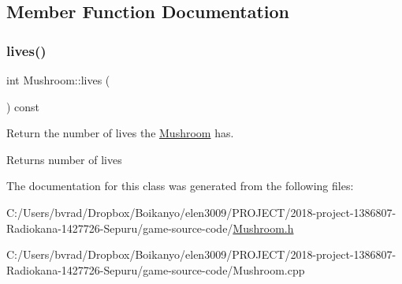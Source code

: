 \subsection{Member Function Documentation}
\mbox{\label{class_mushroom_afe84a485e2eb67e1efadd49ef77cb79e}} 
\subsubsection{\texorpdfstring{lives()}{lives()}}
{\footnotesize\ttfamily int Mushroom\+::lives (\begin{DoxyParamCaption}{ }\end{DoxyParamCaption}) const\hspace{0.3cm}{\ttfamily [inline]}}



Return the number of lives the \mbox{\hyperlink{class_mushroom}{Mushroom}} has. 

\begin{DoxyReturn}{Returns}
number of lives 
\end{DoxyReturn}


The documentation for this class was generated from the following files\+:\begin{DoxyCompactItemize}
\item 
C\+:/\+Users/bvrad/\+Dropbox/\+Boikanyo/elen3009/\+P\+R\+O\+J\+E\+C\+T/2018-\/project-\/1386807-\/\+Radiokana-\/1427726-\/\+Sepuru/game-\/source-\/code/\mbox{\hyperlink{_mushroom_8h}{Mushroom.\+h}}\item 
C\+:/\+Users/bvrad/\+Dropbox/\+Boikanyo/elen3009/\+P\+R\+O\+J\+E\+C\+T/2018-\/project-\/1386807-\/\+Radiokana-\/1427726-\/\+Sepuru/game-\/source-\/code/Mushroom.\+cpp\end{DoxyCompactItemize}
